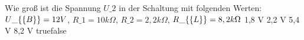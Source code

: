     {Wie groß ist die Spannung $U\_2$ in der Schaltung mit folgenden Werten: $U\_\{\textrm\{B\}\} = 12 V$, $R\_1 = 10 k\Omega$, $R\_2 = 2,2 k\Omega$, $R\_\{\textrm\{L\}\} = 8,2 k\Omega$}
    {1,8 V}
    {2,2 V}
    {5,4 V}
    {8,2 V}
    {true}{false}